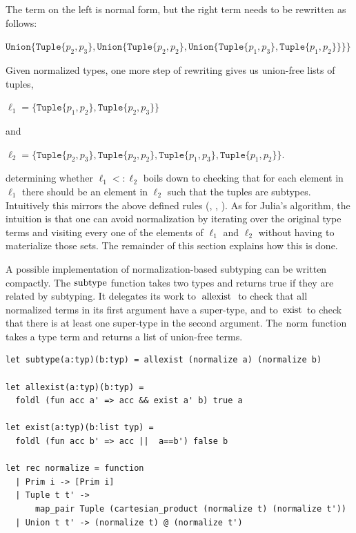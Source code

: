 \documentclass[a4paper,english]{lipics-v2019}
\newcommand{\xt}[1]{\texttt{#1}}
\newcommand{\union}[2]{\xt{Union\{}#1,#2\xt{\}}}
\renewcommand{\c}[1]{\ensuremath{\text{\lstinline{#1}}}\xspace}
\newcommand{\tuple}[1]{\xt{Tuple\{}#1\xt{\}}}
\begin{document}
\noindent
The term on the left is normal form, but the right term  needs to be
rewritten as follows:

\medskip
$\union{ \tuple{p_2,p_3}}
  {\union{ \tuple{p_2,p_2}}
    {\union{ \tuple{p_1,p_3}}
           {\tuple{p_1,p_2}}}}$
\medskip

\noindent
Given normalized types, one more step of rewriting gives us union-free
lists of tuples,

\medskip
$\ell_1 = \{  \tuple{p_1,p_2}, \tuple{p_2,p_3}  \}$
\medskip

\noindent and

\medskip
$\ell_2 = \{  \tuple{p_2,p_3}, \tuple{p_2,p_2}, \tuple{p_1,p_3}, 
          \tuple{p_1,p_2} \}$.
\medskip

\noindent determining whether $\ell_1 <: \ell_2$ boils down to checking that
for each element in $\ell_1$ there should be an element in $\ell_2$ such
that the tuples are subtypes. Intuitively this mirrors the above defined
rules ({\sc [allexist]}, {\sc [existL/R]}, {\sc [tuple]}). As for Julia's
algorithm, the intuition is that one can avoid normalization by iterating
over the original type terms and visiting every one of the elements of
$\ell_1$ and $\ell_2$ without having to materialize those sets. The
remainder of this section explains how this is done.

A possible implementation of normalization-based subtyping can be written
compactly.  The \c{subtype} function takes two types and returns true if
they are related by subtyping. It delegates its work to \c{allexist} to
check that all normalized terms in its first argument have a super-type, and
to \c{exist} to check that there is at least one super-type in the second
argument.  The \c{norm} function takes a type term and returns a list of
union-free terms.

\begin{lstlisting}
let subtype(a:typ)(b:typ) = allexist (normalize a) (normalize b)

let allexist(a:typ)(b:typ) = 
  foldl (fun acc a' => acc && exist a' b) true a

let exist(a:typ)(b:list typ) = 
  foldl (fun acc b' => acc ||  a==b') false b

let rec normalize = function
  | Prim i -> [Prim i]
  | Tuple t t' -> 
      map_pair Tuple (cartesian_product (normalize t) (normalize t'))
  | Union t t' -> (normalize t) @ (normalize t')
\end{lstlisting}


\end{document}
